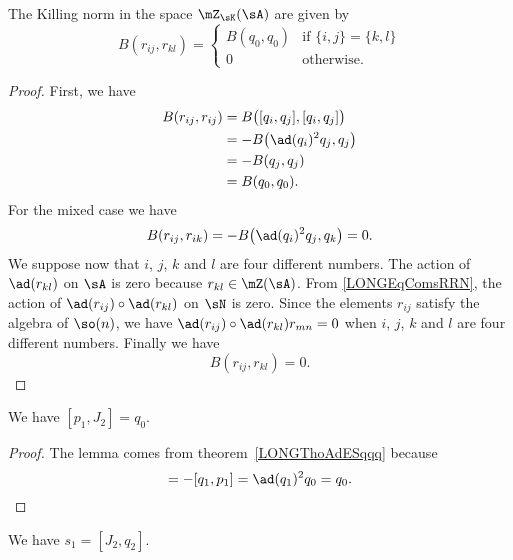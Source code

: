 \begin{proposition}
	The Killing norm in the space $\mZ_{\sK}(\sA)$ are given by
	\begin{equation}
		B(r_{ij},r_{kl})=\begin{cases}
			B(q_0,q_0)	&	\text{if }\{ i,j \}=\{ k,l \}\\
			0	&	 \text{otherwise}.
		\end{cases}
	\end{equation}
\end{proposition}

\begin{proof}
	First, we have
	\begin{equation}
		\begin{aligned}[]
			B(r_{ij},r_{ij})&=B\big( [q_i,q_j],[q_i,q_j] \big)\\
					&=-B\big( \ad(q_i)^2q_j,q_j \big)\\
					&=-B(q_j,q_j)\\
					&=B(q_0,q_0).
		\end{aligned}
	\end{equation}
	For the mixed case we have
	\begin{equation}
			B(r_{ij},r_{ik})=-B\big( \ad(q_i)^2q_j,q_k \big)=0.
	\end{equation}
	We suppose now that $i$, $j$, $k$ and $l$ are four different numbers. The action of $\ad(r_{kl})$ on $\sA$ is zero because $r_{kl}\in\mZ(\sA)$. From \eqref{LONGEqComsRRN}, the action of $\ad(r_{ij})\circ\ad(r_{kl})$ on $\sN$ is zero. Since the elements $r_{ij}$ satisfy the algebra of $\so(n)$, we have $\ad(r_{ij})\circ\ad(r_{kl})r_{mn}=0$ when $i$, $j$, $k$ and $l$ are four different numbers. Finally we have
	\begin{equation}
		B(r_{ij},r_{kl})=0.
	\end{equation}
\end{proof}

\begin{lemma}		\label{LONGLempunjdeuxqzero}
	We have $[p_1,J_2]=q_0$.
\end{lemma}

\begin{proof}
	The lemma comes from theorem~\ref{LONGThoAdESqqq} because
	\begin{equation}
		[p_1,J_2]=-[q_1,p_1]=\ad(q_1)^2q_0=q_0.
	\end{equation}
\end{proof}

\begin{lemma}				 \label{LONGlemJDeuxqDeuxsUn}
	We have $s_1=[J_2,q_2]$.
\end{lemma}


